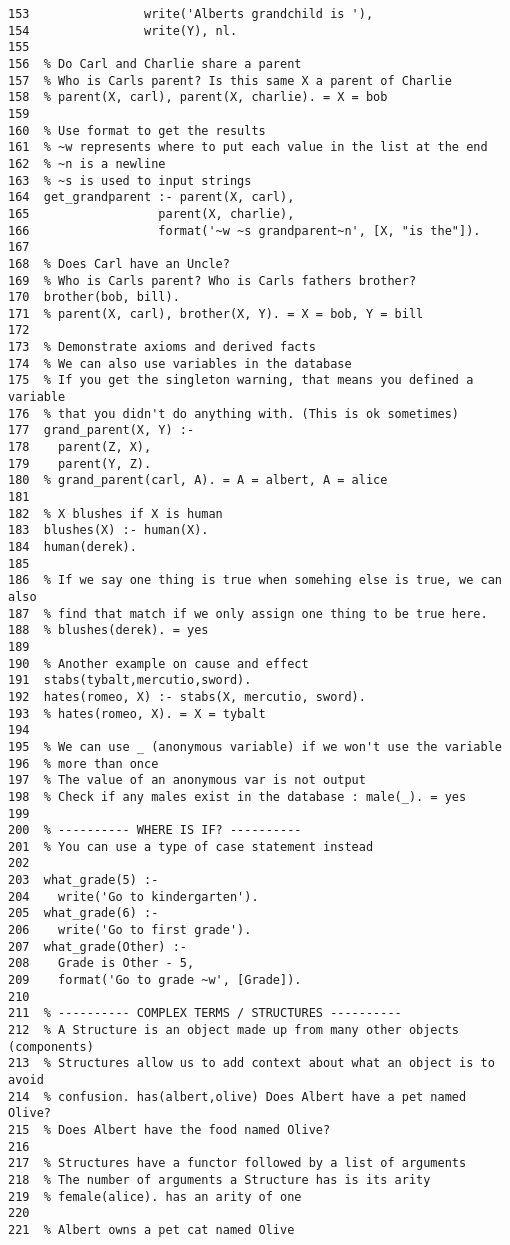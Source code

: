 \documentclass[11pt]{article}
\begin{document}
\begin{verbatim}
153                write('Alberts grandchild is '),
154                write(Y), nl.
155  
156  % Do Carl and Charlie share a parent
157  % Who is Carls parent? Is this same X a parent of Charlie
158  % parent(X, carl), parent(X, charlie). = X = bob
159  
160  % Use format to get the results
161  % ~w represents where to put each value in the list at the end
162  % ~n is a newline
163  % ~s is used to input strings
164  get_grandparent :- parent(X, carl),
165                  parent(X, charlie),
166                  format('~w ~s grandparent~n', [X, "is the"]).
167  
168  % Does Carl have an Uncle?
169  % Who is Carls parent? Who is Carls fathers brother?
170  brother(bob, bill).
171  % parent(X, carl), brother(X, Y). = X = bob, Y = bill
172  
173  % Demonstrate axioms and derived facts
174  % We can also use variables in the database
175  % If you get the singleton warning, that means you defined a variable
176  % that you didn't do anything with. (This is ok sometimes)
177  grand_parent(X, Y) :-
178    parent(Z, X),
179    parent(Y, Z).
180  % grand_parent(carl, A). = A = albert, A = alice
181  
182  % X blushes if X is human
183  blushes(X) :- human(X).
184  human(derek).
185  
186  % If we say one thing is true when somehing else is true, we can also
187  % find that match if we only assign one thing to be true here.
188  % blushes(derek). = yes
189  
190  % Another example on cause and effect
191  stabs(tybalt,mercutio,sword).
192  hates(romeo, X) :- stabs(X, mercutio, sword).
193  % hates(romeo, X). = X = tybalt
194  
195  % We can use _ (anonymous variable) if we won't use the variable
196  % more than once
197  % The value of an anonymous var is not output
198  % Check if any males exist in the database : male(_). = yes
199  
200  % ---------- WHERE IS IF? ----------
201  % You can use a type of case statement instead
202  
203  what_grade(5) :-
204    write('Go to kindergarten').
205  what_grade(6) :-
206    write('Go to first grade').
207  what_grade(Other) :-
208    Grade is Other - 5,
209    format('Go to grade ~w', [Grade]).
210  
211  % ---------- COMPLEX TERMS / STRUCTURES ----------
212  % A Structure is an object made up from many other objects (components)
213  % Structures allow us to add context about what an object is to avoid
214  % confusion. has(albert,olive) Does Albert have a pet named Olive?
215  % Does Albert have the food named Olive?
216  
217  % Structures have a functor followed by a list of arguments
218  % The number of arguments a Structure has is its arity
219  % female(alice). has an arity of one
220  
221  % Albert owns a pet cat named Olive

\end{verbatim}
\end{document}
